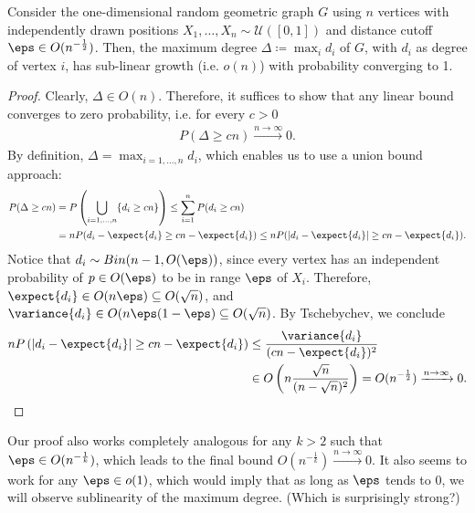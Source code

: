 \begin{aufgabe}
 Consider the one-dimensional random geometric graph $G$ using $n$ vertices with independently drawn positions $X_1, \dots, X_n  \sim \mathcal U([0,1])$
 and distance cutoff $\eps \in O(n^{-\frac{1}{2}})$. Then, the maximum degree $\Delta \coloneqq \max_{i} d_i$ of $G$, with $d_i$ as degree of vertex $i$, has sub-linear growth (i.e. $o(n)$) with probability converging to 1.
 \begin{proof}
     Clearly, $\Delta \in O(n)$. Therefore, it suffices to show that any linear bound converges to zero probability, i.e. for every $c > 0$
     \begin{align*}
         P(\Delta \geq cn) \xrightarrow{n \rightarrow \infty} 0.
     \end{align*}
     By definition, $\Delta = \max_{i=1,\dots,n} d_i$, which enables us to use a union bound approach:
     \begin{align*}
          P(\Delta \geq cn) &= P\left(\bigcup_{i=1,\dots,n}\{d_i \geq  cn \} \right) \leq \sum_{i=1}^n P(d_i \geq cn) \\
          &= n P(d_i - \expect{d_i} \geq cn - \expect{d_i}) \leq n P(|d_i - \expect{d_i}| \geq cn - \expect{d_i}).
     \end{align*}
     Notice that $d_i \sim Bin(n-1,O(\eps))$, since every vertex has an independent probability of $p \in O(\eps)$ to be in range $\eps$ of $X_i$.
     Therefore, $\expect{d_i} \in O(n \eps) \subseteq O(\sqrt{n})$, and $\variance{d_i} \in O(n \eps (1-\eps) \subseteq O(\sqrt{n})$.
     By Tschebychev, we conclude
     \begin{align*}
         n P\left(|d_i - \expect{d_i}| \geq cn - \expect{d_i}\right) &\leq \frac{\variance{d_i}}{(cn - \expect{d_i})^2} \\
         &\in O \left( n\frac{\sqrt{n}}{(n-\sqrt{n})^2} \right) = O(n^{-\frac{1}{2}}) \xrightarrow{n \rightarrow \infty} 0.
     \end{align*}
 \end{proof}
 Our proof also works completely analogous for any $k > 2$ such that $\eps \in O(n^{-\frac{1}{k}})$, which leads to the final bound $O(n^{-\frac{1}{k}}) \xrightarrow{n \rightarrow \infty} 0$.
 It also seems to work for any $\eps \in o(1)$, which would imply that as long as $\eps$ tends to $0$, we will observe sublinearity of the maximum degree. (Which is surprisingly strong?)
\end{aufgabe}